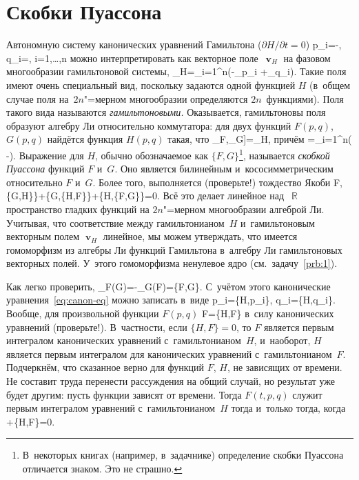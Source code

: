 \documentclass[a4paper,11pt]{article}
\def\[#1\]{\begin{align*}#1\end{align*}}
\newcommand\eqtag[1]{\refstepcounter{equation}\tag{\theequation}\label{#1}}
\newcommand\slashfrac[2]{{#1/#2}}
\theoremstyle{definition}
\begin{document}
\section{Скобки Пуассона}

Автономную систему канонических уравнений Гамильтона ($\slashfrac{\partial
H}{\partial t}=0$)
	\[
	\dot p_i=-,
	\quad
	\dot q_i=,
	\quad
	i=1,\ldots,n
	\eqtag{eq:canon-eq}
	\]
можно интерпретировать как векторное поле~$\mbfv_H$ на фазовом многообразии
гамильтоновой системы,
	\[
	\mbfv_H=\sum_{i=1}^n\left(-\partial_{p_i}
		+\partial_{q_i}\right).
	\]
Такие поля имеют очень специальный вид, поскольку задаются одной функцией $H$
(в~общем случае поля на~$2n$"=мерном многообразии определяются $2n$~функциями).
Поля такого вида называются \emph{гамильтоновыми.} Оказывается, гамильтоновы
поля образуют алгебру Ли относительно коммутатора: для двух функций $F(p,q)$,
$G(p,q)$ найдётся функция $H(p,q)$ такая, что
	\[
	[\mbfv_F,\mbfv_G]=\mbfv_H,
	\]
причём
	\[
	H=\sum_{i=1}^n\left(\frac{\partial G}{\partial q_i}
		-\right).
	\]
Выражение для $H$, обычно обозначаемое как $\{F,G\}$\footnote{В~некоторых
книгах (например, в~задачнике) определение скобки Пуассона отличается знаком.
Это не страшно.}, называется \emph{скобкой Пуассона\/} функций $F$ и~$G$. Оно
является билинейным и~кососимметрическим относительно $F$ и~$G$. Более того,
выполняется (проверьте!) тождество Якоби
	\[
	\{F,\{G,H\}\}+\{G,\{H,F\}\}+\{H,\{F,G\}\}=0.
	\]
Всё это делает линейное над~$\BbbR$ пространство гладких функций на
$2n$"=мерном многообразии алгеброй Ли. Учитывая, что соответствие между
гамильтонианом~$H$ и~гамильтоновым векторным полем $\mbfv_H$ линейное, мы можем
утверждать, что имеется гомоморфизм из алгебры Ли функций Гамильтона в~алгебру
Ли гамильтоновых векторных полей. У~этого гомоморфизма ненулевое ядро
(см.~задачу~\ref{prb:1}).

Как легко проверить,
	\[
	\mbfv_F(G)=-\mbfv_G(F)=\{F,G\}.
	\]
С~учётом этого канонические уравнения~\eqref{eq:canon-eq} можно записать в~виде
	\[
	\dot p_i=\{H,p_i\},
	\quad
	\dot q_i=\{H,q_i\}.
	\]
Вообще, для произвольной функции $F(p,q)$
	\[
	\dot F=\{H,F\}
	\]
в~силу канонических уравнений (проверьте!). В~частности, если $\{H,F\}=0$, то
$F$ является первым интегралом канонических уравнений с~гамильтонианом~$H$,
и~наоборот, $H$ является первым интегралом для канонических уравнений
с~гамильтонианом~$F$. Подчеркнём, что сказанное верно для функций $F$, $H$, не
зависящих от времени. Не составит труда перенести рассуждения на общий случай,
но результат уже будет другим: пусть функции зависят от времени. Тогда
$F(t,p,q)$ служит первым интегралом уравнений с~гамильтонианом~$H$ тогда
и~только тогда, когда
	\[
	\frac{\partial F}{\partial t}+\{H,F\}=0.
	\]
\end{document}
